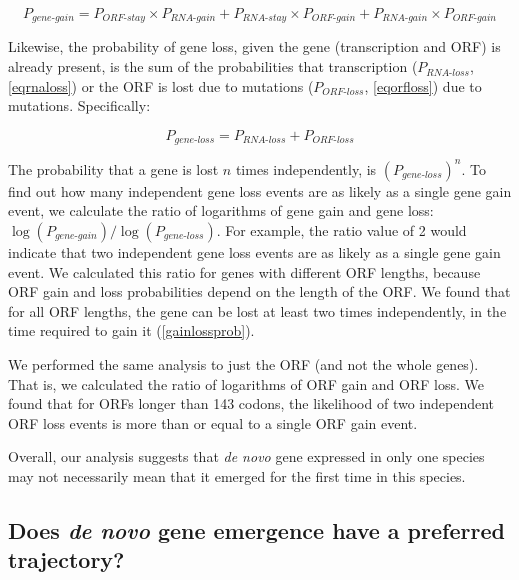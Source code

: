 \documentclass[12pt,a4paper]{article}
\begin{document}
\begin{equation}
P_\textit{gene-gain} = P_\textit{ORF-stay}\times P_\textit{RNA-gain} + P_\textit{RNA-stay}\times P_\textit{ORF-gain} + P_\textit{RNA-gain}\times P_\textit{ORF-gain}
\label{genegaineq}
\end{equation}

Likewise, the probability of gene loss, given the gene (transcription and ORF) is already present, is the sum of the probabilities that transcription ($P_\textit{RNA-loss}$, \autoref{eqrnaloss}) or the ORF is lost due to mutations ($P_\textit{ORF-loss}$, \autoref{eqorfloss}) due to mutations. Specifically:

\begin{equation}
P_\textit{gene-loss} = P_\textit{RNA-loss} + P_\textit{ORF-loss}
\label{genelosseq}
\end{equation}

The probability that a gene is lost $n$ times independently, is $(P_\textit{gene-loss})^{n}$. To find out how many independent gene loss events are as likely as a single gene gain event, we calculate the ratio of logarithms of gene gain and gene loss: $\log(P_\textit{gene-gain})/\log(P_\textit{gene-loss})$. For example, the ratio value of 2 would indicate that two independent gene loss events are as likely as a single gene gain event. We calculated this ratio for genes with different ORF lengths, because ORF gain and loss probabilities depend on the length of the ORF. We found that for all ORF lengths, the gene can be lost at least two times independently, in the time required to gain it (\autoref{gainlossprob}). 

We performed the same analysis to just the ORF (and not the whole genes). That is, we calculated the ratio of logarithms of ORF gain and ORF loss. We found that for ORFs longer than 143 codons, the likelihood of two independent ORF loss events is more than or equal to a single ORF gain event. 

Overall, our analysis suggests that \textit{de novo} gene expressed in only one species may not necessarily mean that it emerged for the first time in this species. 

\subsection{Does \textit{de novo} gene emergence have a preferred trajectory?}
\end{document}
